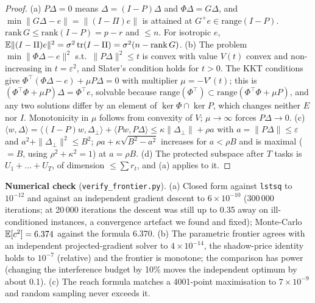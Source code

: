 \begin{proof}
(a) $P\Delta=0$ means $\Delta=(I-P)\Delta$ and $\Phi\Delta=G\Delta$, and $\min\|G\Delta-e\|=\|(I-\Pi)e\|$ is attained at $G^{+}e\in\mathrm{range}(I-P)$. $\mathrm{rank}\,G\le\mathrm{rank}(I-P)=p-r$ and $\le n$. For isotropic $e$, $\mathbb{E}\|(I-\Pi)e\|^2=\sigma^2\operatorname{tr}(I-\Pi)=\sigma^2(n-\mathrm{rank}\,G)$.
(b) The problem $\min\|\Phi\Delta-e\|^2$ s.t.\ $\|P\Delta\|^2\le t$ is convex with value $V(t)$ convex and non-increasing in $t=\varepsilon^2$, and Slater's condition holds for $t>0$. The KKT conditions give $\Phi^\top(\Phi\Delta-e)+\mu P\Delta=0$ with multiplier $\mu=-V'(t)$; this is $(\Phi^\top\Phi+\mu P)\Delta=\Phi^\top e$, solvable because $\mathrm{range}(\Phi^\top)\subset\mathrm{range}(\Phi^\top\Phi+\mu P)$, and any two solutions differ by an element of $\ker\Phi\cap\ker P$, which changes neither $E$ nor $I$. Monotonicity in $\mu$ follows from convexity of $V$; $\mu\to\infty$ forces $P\Delta\to0$.
(c) $\langle w,\Delta\rangle=\langle(I-P)w,\Delta_\perp\rangle+\langle Pw,P\Delta\rangle\le\kappa\|\Delta_\perp\|+\rho a$ with $a=\|P\Delta\|\le\varepsilon$ and $a^2+\|\Delta_\perp\|^2\le B^2$; $\rho a+\kappa\sqrt{B^2-a^2}$ increases for $a<\rho B$ and is maximal ($=B$, using $\rho^2+\kappa^2=1$) at $a=\rho B$.
(d) The protected subspace after $T$ tasks is $U_1+\dots+U_T$, of dimension $\le\sum r_t$, and (a) applies to it.
\end{proof}
\textbf{Numerical check} (\texttt{verify\_frontier.py}). (a) Closed form against \texttt{lstsq} to $10^{-12}$ and against an independent gradient descent to $6\times10^{-10}$ (300\,000 iterations; at 20\,000 iterations the descent was still up to 0.35 away on ill-conditioned instances, a convergence artefact we found and fixed); Monte-Carlo $\mathbb{E}[c^2]=6.374$ against the formula $6.370$. (b) The parametric frontier agrees with an independent projected-gradient solver to $4\times10^{-14}$, the shadow-price identity holds to $10^{-7}$ (relative) and the frontier is monotone; the comparison has power (changing the interference budget by 10\% moves the independent optimum by about 0.1). (c) The reach formula matches a 4001-point maximisation to $7\times10^{-9}$ and random sampling never exceeds it.

